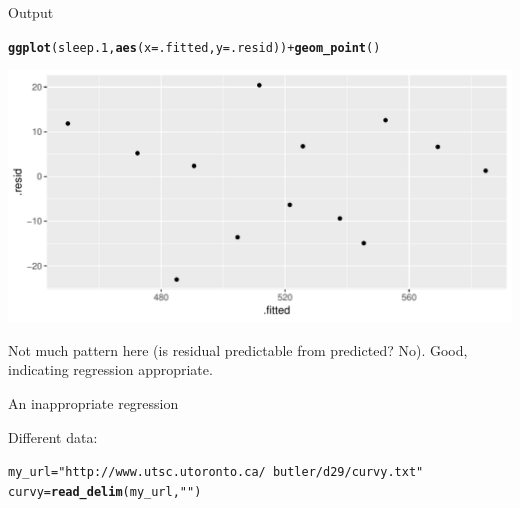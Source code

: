 \documentclass[unknownkeysallowed]{beamer}\usepackage[]{graphicx}\usepackage[]{color}
\makeatletter
\def\maxwidth{ %
  \ifdim\Gin@nat@width>\linewidth
    \linewidth
  \else
    \Gin@nat@width
  \fi
}
\newcommand{\hlstr}[1]{\textcolor[rgb]{0.192,0.494,0.8}{#1}}%
\newcommand{\hlopt}[1]{\textcolor[rgb]{0,0,0}{#1}}%
\newcommand{\hlstd}[1]{\textcolor[rgb]{0.345,0.345,0.345}{#1}}%
\newcommand{\hlkwb}[1]{\textcolor[rgb]{0.69,0.353,0.396}{#1}}%
\newcommand{\hlkwc}[1]{\textcolor[rgb]{0.333,0.667,0.333}{#1}}%
\newcommand{\hlkwd}[1]{\textcolor[rgb]{0.737,0.353,0.396}{\textbf{#1}}}%
\newenvironment{kframe}{%
 \def\at@end@of@kframe{}%
 \ifinner\ifhmode%
  \def\at@end@of@kframe{\end{minipage}}%
  \begin{minipage}{\columnwidth}%
 \fi\fi%
 \def\FrameCommand##1{\hskip\@totalleftmargin \hskip-\fboxsep
 \colorbox{shadecolor}{##1}\hskip-\fboxsep
     \hskip-\linewidth \hskip-\@totalleftmargin \hskip\columnwidth}%
 \MakeFramed {\advance\hsize-\width
   \@totalleftmargin\z@ \linewidth\hsize
   \@setminipage}}%
 {\par\unskip\endMakeFramed%
 \at@end@of@kframe}
\newenvironment{knitrout}{}{} %
\makeatother
\begin{document}
\begin{frame}[fragile]{Output}

 
\begin{knitrout}
\color{fgcolor}\begin{kframe}
\begin{alltt}
\hlkwd{ggplot}\hlstd{(sleep.1,}\hlkwd{aes}\hlstd{(}\hlkwc{x}\hlstd{=.fitted,}\hlkwc{y}\hlstd{=.resid))}\hlopt{+}\hlkwd{geom_point}\hlstd{()}
\end{alltt}
\end{kframe}
\includegraphics[width=\maxwidth]{figure/akjhkadjfhjahnkkk-1} 

\end{knitrout}
  

Not much pattern here (is residual predictable from predicted? No). Good, indicating regression appropriate.
  
\end{frame}


\begin{frame}[fragile]{An inappropriate regression}

Different data:  
  
 
\begin{knitrout}
\color{fgcolor}\begin{kframe}
\begin{alltt}
\hlstd{my_url}\hlkwb{=}\hlstr{"http://www.utsc.utoronto.ca/~butler/d29/curvy.txt"}
\hlstd{curvy}\hlkwb{=}\hlkwd{read_delim}\hlstd{(my_url,}\hlstr{" "}\hlstd{)}
\end{alltt}


{\ttfamily\noindent\itshape\color{messagecolor}{\#\# Parsed with column specification:\\\#\# cols(\\\#\#\ \  xx = col\_double(),\\\#\#\ \  yy = col\_double()\\\#\# )}}\end{kframe}
\end{knitrout}
  



\end{frame}
\end{document}
